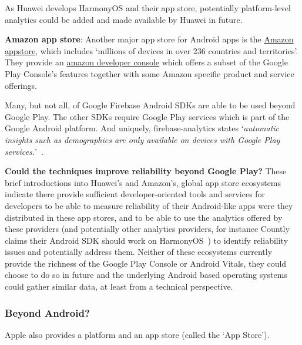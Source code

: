 As Huawei develops HarmonyOS and their app store, potentially platform-level analytics could be added and made available by Huawei in future.

\textbf{Amazon app store}: 
Another major app store for Android apps is the \href{https://developer.amazon.com/apps-and-games}{Amazon appstore}, which includes `millions of devices in over 236 countries and territories'. They provide an \href{https://developer.amazon.com/settings/console/home}{amazon developer console} which offers a subset of the Google Play Console's features together with some Amazon specific product and service offerings. 

Many, but not all, of Google Firebase Android SDKs are able to be used beyond Google Play. The other SDKs require Google Play services which is part of the Google Android platform. And uniquely, firebase-analytics states `\emph{automatic insights such as demographics are only available on devices with Google Play services.}'~. 


\textbf{Could the techniques improve reliability beyond Google Play?} 
These brief introductions into Huawei's and Amazon's, global app store ecosystems indicate there provide sufficient developer-oriented tools and services for developers to be able to measure reliability of their Android-like apps were they distributed in these app stores, and to be able to use the analytics offered by these providers (and potentially other analytics providers, for instance Countly claims their Android SDK should work on HarmonyOS~) to identify reliability issues and potentially address them. Neither of these ecosystems currently provide the richness of the Google Play Console or Android Vitals, they could choose to do so in future and the underlying Android based operating systems could gather similar data, at least from a technical perspective.

\subsubsection{Beyond Android?}

Apple also provides a platform and an app store (called the `App Store'). 

